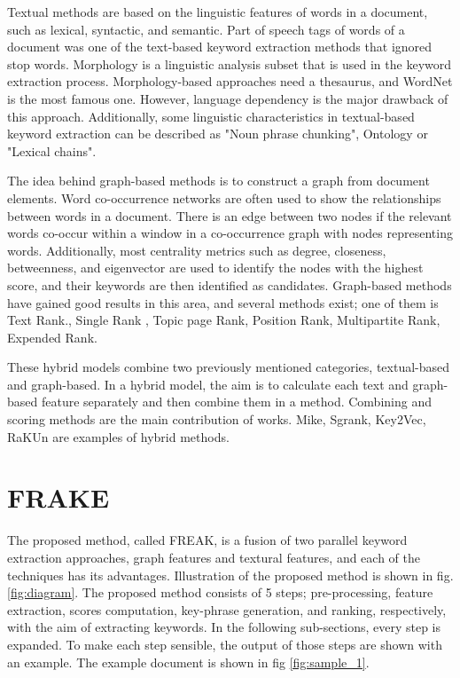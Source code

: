 \documentclass[3p]{elsarticle}
\begin{document}
Textual methods are based on the linguistic features of words in a document, such as lexical, syntactic, and semantic. Part of speech tags of words of a document was one of the text-based keyword extraction methods that ignored stop words\cite{10.3115/1119355.1119383}. Morphology is a linguistic analysis subset that is used in the keyword extraction process. Morphology-based approaches\cite{li2015keyphrase} need a thesaurus, and WordNet\cite{miller1998wordnet} is the most famous one. However, language dependency is the major drawback of this approach. Additionally, some linguistic characteristics in textual-based keyword extraction can be described as "Noun phrase chunking"\cite{hulth2003improved}, Ontology\cite{shamsfard2008} or "Lexical chains"\cite{enss2006investigation}.

The idea behind graph-based methods is to construct a graph from document elements. Word co-occurrence networks are often used to show the relationships between words in a document. There is an edge between two nodes if the relevant words co-occur within a window in a co-occurrence graph with nodes representing words. Additionally, most centrality metrics such as degree, closeness, betweenness, and eigenvector are used to identify the nodes with the highest score, and their keywords are then identified as candidates. Graph-based methods have gained good results in this area, and several methods exist; one of them is Text Rank.\cite{Mihalcea2004}, Single Rank \cite{Wan2008}, Topic page Rank\cite{Sterckx2015}, Position Rank\cite{Florescu2017}, Multipartite Rank\cite{Boudin2018}, Expended Rank\cite{Wan2008}.

These hybrid models combine two previously mentioned categories, textual-based and graph-based. In a hybrid model, the aim is to calculate each text and graph-based feature separately and then combine them in a method. Combining and scoring methods are the main contribution of works. Mike\cite{10.1145/3132847.3132956}, Sgrank\cite{sgrank-2015}, Key2Vec\cite{mahata-key2vec}, RaKUn\cite{rakun2019} are examples of hybrid methods.
\section{FRAKE} \label{sec:proposed_method}
The proposed method, called FREAK, is a fusion of two parallel keyword extraction approaches, graph features and textural features, and each of the techniques has its advantages. Illustration of the proposed method is shown in fig. \ref{fig:diagram}. The proposed method consists of 5 steps; pre-processing, feature extraction, scores computation, key-phrase generation, and ranking, respectively, with the aim of extracting keywords. In the following sub-sections, every step is expanded. To make each step sensible, the output of those steps are shown with an example. The example document is shown in fig \ref{fig:sample_1}.
\end{document}
